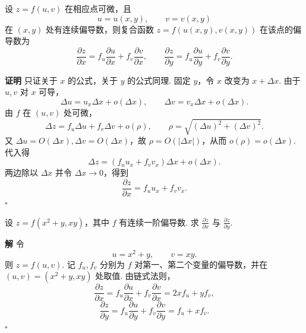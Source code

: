 \documentclass[fontset=fandol]{ctexart}
\newenvironment{proofdetail}{\par\noindent\textbf{证明}\quad}{\hfill$\square$\par\vspace{0.8em}}
\newenvironment{solution}{\par\noindent\textbf{解}\quad}{\hfill$\square$\par\vspace{0.8em}}
\begin{document}
\begin{theorem}
设 $z=f(u,v)$ 在相应点可微，且
\[
u=u(x,y),\qquad v=v(x,y)
\]
在 $(x,y)$ 处有连续偏导数，则复合函数 $z=f(u(x,y),v(x,y))$ 在该点的偏导数为
\[
\frac{\partial z}{\partial x}=f_u\frac{\partial u}{\partial x}+f_v\frac{\partial v}{\partial x},
\qquad
\frac{\partial z}{\partial y}=f_u\frac{\partial u}{\partial y}+f_v\frac{\partial v}{\partial y}.
\]
\end{theorem}
\begin{proofdetail}
只证关于 $x$ 的公式，关于 $y$ 的公式同理. 固定 $y$，令 $x$ 改变为 $x+\Delta x$. 由于 $u,v$ 对 $x$ 可导，
\[
\Delta u=u_x\Delta x+o(\Delta x),\qquad
\Delta v=v_x\Delta x+o(\Delta x).
\]
由 $f$ 在 $(u,v)$ 处可微，
\[
\Delta z=f_u\Delta u+f_v\Delta v+o(\rho),
\qquad \rho=\sqrt{(\Delta u)^2+(\Delta v)^2}.
\]
又 $\Delta u=O(\Delta x),\Delta v=O(\Delta x)$，故 $\rho=O(|\Delta x|)$，从而 $o(\rho)=o(\Delta x)$. 代入得
\[
\Delta z=(f_u u_x+f_v v_x)\Delta x+o(\Delta x).
\]
两边除以 $\Delta x$ 并令 $\Delta x\to0$，得到
\[
\frac{\partial z}{\partial x}=f_u u_x+f_v v_x.
\]
\end{proofdetail}

\begin{example}[二元复合函数偏导]
设 $z=f(x^2+y,xy)$，其中 $f$ 有连续一阶偏导数. 求 $\frac{\partial z}{\partial x}$ 与 $\frac{\partial z}{\partial y}$.
\end{example}
\begin{solution}
令
\[
u=x^2+y,\qquad v=xy.
\]
则 $z=f(u,v)$. 记 $f_u,f_v$ 分别为 $f$ 对第一、第二个变量的偏导数，并在 $(u,v)=(x^2+y,xy)$ 处取值. 由链式法则，
\[
\frac{\partial z}{\partial x}
=f_u\frac{\partial u}{\partial x}+f_v\frac{\partial v}{\partial x}
=2x f_u+y f_v,
\]
\[
\frac{\partial z}{\partial y}
=f_u\frac{\partial u}{\partial y}+f_v\frac{\partial v}{\partial y}
=f_u+x f_v.
\]
\end{solution}
\end{document}
